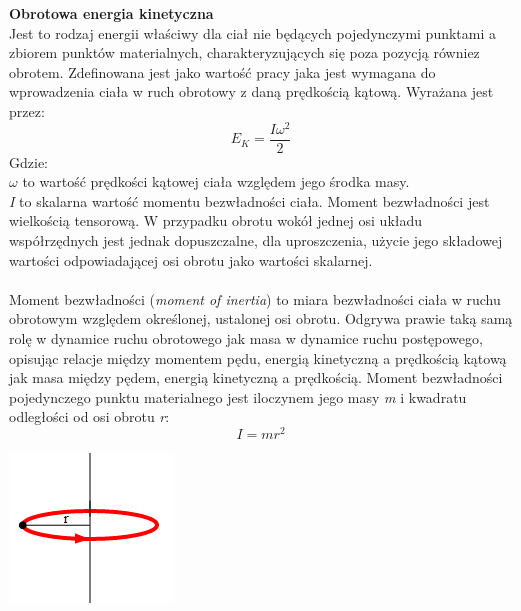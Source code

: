 \textbf{Obrotowa energia kinetyczna}\\
Jest to rodzaj energii właściwy dla ciał nie będących pojedynczymi punktami a
zbiorem punktów materialnych, charakteryzujących się poza pozycją równiez
obrotem. Zdefinowana jest jako wartość pracy jaka jest wymagana do wprowadzenia
ciała w ruch obrotowy z daną prędkością kątową. Wyrażana jest przez:
\begin{equation}
E_{K} = \frac{I\omega^{2}}{2}
\end{equation}
Gdzie:\\
$ \omega $ to wartość prędkości kątowej ciała względem jego środka masy.\\
\emph{I} to skalarna wartość momentu bezwładności ciała. Moment bezwładności
jest wielkością tensorową. W przypadku obrotu wokół jednej osi układu
współrzędnych jest jednak dopuszczalne, dla uproszczenia, użycie jego
składowej wartości odpowiadającej osi obrotu jako wartości skalarnej.\\
\\
Moment bezwładności (\emph{moment of inertia}) to miara bezwładności ciała
w ruchu obrotowym względem określonej, ustalonej osi obrotu. Odgrywa prawie taką samą
rolę w dynamice ruchu obrotowego jak masa w dynamice ruchu postępowego, opisując
relacje między momentem pędu, energią kinetyczną a prędkością kątową jak masa
między pędem, energią kinetyczną a prędkością. Moment bezwładności pojedynczego
punktu materialnego jest iloczynem jego masy \emph{m} i kwadratu odległości od
osi obrotu \emph{r}:
\begin{equation}
I = mr^{2}
\end{equation}

\begin{center}
\includegraphics{./img/inertia.png}
\end{center}

